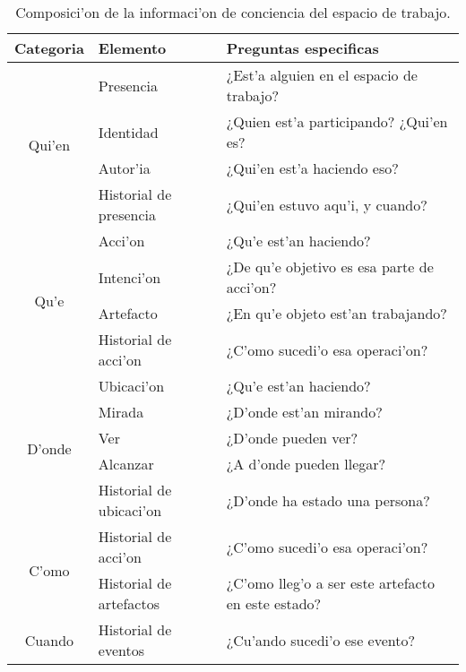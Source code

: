 \begin{table}[ht]
\centering
\def\arraystretch{1.5}
\begin{tabular}{|c|l|l|}
\hline
\textbf{Categoria}      & \textbf{Elemento}       & \textbf{Preguntas especificas}                     \\ \hline
\multirow{4}{*}{Qui'en} & Presencia               & ¿Est'a alguien en el espacio de trabajo?           \\ \cline{2-3} 
                        & Identidad               & ¿Quien est'a participando? ¿Qui'en es?             \\ \cline{2-3} 
                        & Autor'ia                & ¿Qui'en est'a haciendo eso?                        \\ \cline{2-3} 
                        & Historial de presencia  & ¿Qui'en estuvo aqu'i, y cuando?                    \\ \hline
\multirow{4}{*}{Qu'e}   & Acci'on                 & ¿Qu'e est'an haciendo?                             \\ \cline{2-3} 
                        & Intenci'on              & ¿De qu'e objetivo es esa parte de acci'on?         \\ \cline{2-3} 
                        & Artefacto               & ¿En qu'e objeto est'an trabajando?                 \\ \cline{2-3} 
                        & Historial de acci'on    & ¿C'omo sucedi'o esa operaci'on?                    \\ \hline
\multirow{5}{*}{D'onde} & Ubicaci'on              & ¿Qu'e est'an haciendo?                             \\ \cline{2-3} 
                        & Mirada                  & ¿D'onde est'an mirando?                            \\ \cline{2-3} 
                        & Ver                     & ¿D'onde pueden ver?                                \\ \cline{2-3} 
                        & Alcanzar                & ¿A d'onde pueden llegar?                           \\ \cline{2-3} 
                        & Historial de ubicaci'on & ¿D'onde ha estado una persona?                     \\ \hline
\multirow{2}{*}{C'omo}  & Historial de acci'on    & ¿C'omo sucedi'o esa operaci'on?                    \\ \cline{2-3} 
                        & Historial de artefactos & ¿C'omo lleg'o a ser este artefacto en este estado? \\ \hline
Cuando                  & Historial de eventos    & ¿Cu'ando sucedi'o ese evento?                      \\ \hline
\end{tabular}
\caption{Composici'on de la informaci'on de conciencia del espacio de trabajo.}
\cite{gutwin2002descriptive}
\label{tab:WorkspaceAwareness}
\end{table}

